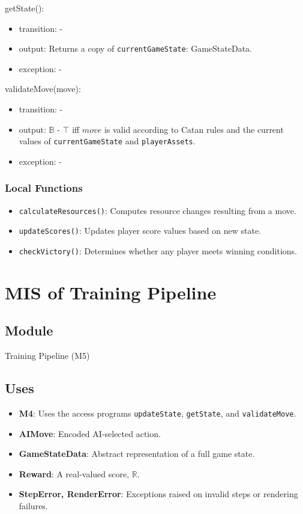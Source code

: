 \documentclass[12pt, titlepage]{article}
\begin{document}
\noindent getState():
\begin{itemize}
\item transition: -
\item output: Returns a copy of \texttt{currentGameState}: GameStateData.
\item exception: -
\end{itemize}

\noindent validateMove(move):
\begin{itemize}
\item transition: -
\item output: $\mathbb{B}$ - $\top$ iff $move$ is valid according to Catan rules and the
      current values of \texttt{currentGameState} and \texttt{playerAssets}.
\item exception: -
\end{itemize}

\subsubsection{Local Functions}
\begin{itemize}
\item \texttt{calculateResources()}: Computes resource changes resulting from a move.
\item \texttt{updateScores()}: Updates player score values based on new state.
\item \texttt{checkVictory()}: Determines whether any player meets winning conditions.
\end{itemize}

\section{MIS of Training Pipeline} \label{M5}

\subsection{Module}
Training Pipeline (M5)

\subsection{Uses}

\begin{itemize}
    \item \textbf{M4}: Uses the access programs 
    \texttt{updateState}, \texttt{getState}, and \texttt{validateMove}.
    \item \textbf{AIMove}: Encoded AI-selected action.
    \item \textbf{GameStateData}: Abstract representation of a full game state.
    \item \textbf{Reward}: A real-valued score, $\mathbb{R}$.
    \item \textbf{StepError, RenderError}: Exceptions raised on invalid steps or rendering failures.
\end{itemize}
\end{document}
